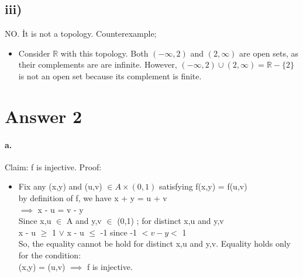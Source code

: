 \documentclass[11pt]{article}
\begin{document}
\subsection*{iii)}
 NO. İt is not a topology. Counterexample;
\begin{itemize}
    \item Consider $\mathbb{R}$ with this topology. Both $(-\infty,2)$ and $(2,\infty)$ are open sets, as their complements are are infinite. However, $(-\infty,2) \cup (2,\infty) = \mathbb{R} - \{2\} $ is not an open set because its complement is finite. 
\end{itemize}

\section*{Answer 2}
\paragraph{a.}
Claim: f is injective. \newline
Proof:
\begin{itemize}
    \item Fix any (x,y) and (u,v) $\in A \times (0,1) $ satisfying f(x,y) = f(u,v) \\
    by definition of f, we have x + y = u + v \\
    $\implies$ x - u = v - y \\
    Since x,u $\in$ A and y,v $\in$ (0,1) ; for distinct x,u and y,v \\
    x - u $\geq$ 1 $\vee$ x - u $\leq$ -1 since -1 $< v - y <$ 1 \\
    So, the equality cannot be hold for distinct x,u and y,v. Equality holds only for the condition: \\
    (x,y) = (u,v) $\implies$ f is injective.
\end{itemize}
\end{document}
